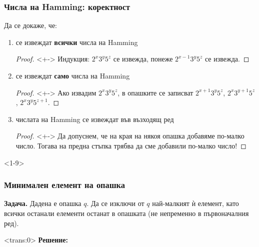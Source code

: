 \documentclass[alsotrans]{beamerswitch}
\begin{document}
\begin{frame}
  \frametitle{Числа на Hamming: коректност}

  Да се докаже, че:
  \begin{enumerate}[<+->]
  \item се извеждат \textbf{всички} числа на Hamming\\
    \begin{proof}<+->
       Индукция: $2^x3^y5^z$ се извежда, понеже $2^{x-1}3^y5^z$ се извежда.
    \end{proof}
  \item се извеждат \textbf{само} числа на Hamming\\
    \begin{proof}<+->
      Ако извадим $2^x3^y5^z$, в опашките се записват $2^{x+1}3^y5^z$, $2^x3^{y+1}5^z$, $2^x3^y5^{z+1}$.
    \end{proof}
  \item числата на Hamming се извеждат във възходящ ред\\
    \begin{proof}<+->
      Да допуснем, че на края на някоя опашка добавяме по-малко число. Тогава на предна стъпка трябва да сме добавили по-малко число!
    \end{proof}
  \end{enumerate}
\end{frame}

\begin{frame}<1-9>
  \frametitle{Минимален елемент на опашка}

  \textbf{Задача.} Дадена е опашка $q$. Да се изключи от $q$ най-малкият ѝ елемент, като всички останали елементи останат в опашката (не непременно в първоначалния ред).\\[1em]
  \begin{onlyenv}<trans:0>
    \pause
    \textbf{Решение:}
    \begin{center}
      \vspace{1em}
    \end{center}
  \end{onlyenv}
\end{frame}
\end{document}
